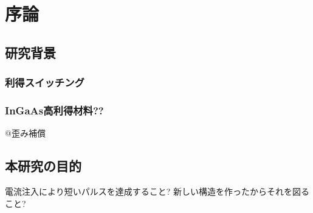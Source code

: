 \chapter{序論}
\section{研究背景}
\subsection{利得スイッチング}

\subsection{InGaAs高利得材料??}
@歪み補償




\section{本研究の目的}
電流注入により短いパルスを達成すること?
新しい構造を作ったからそれを図ること?
